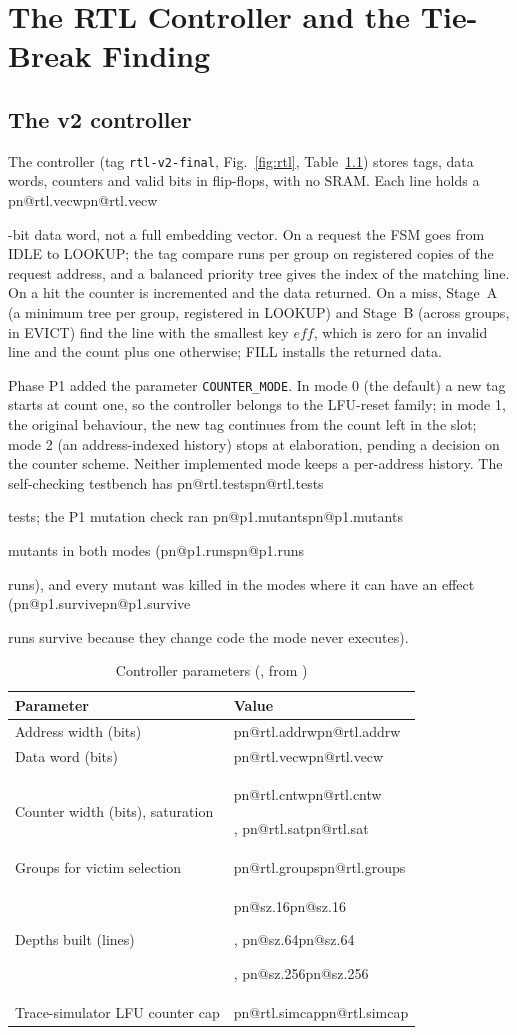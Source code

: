 \documentclass[11pt,a4paper]{report}
\makeatletter
\DeclareRobustCommand{\R}[1]{\ifcsname pn@#1\endcsname\csname pn@#1\endcsname\else
  \PackageError{report}{number key '#1' is not defined in macros.tex}{Run tools/make_paper_macros.py --target report}\fi}
\makeatother
\begin{document}
\chapter{The RTL Controller and the Tie-Break Finding}\label{ch:rtl}
\section{The v2 controller}
The controller (tag \texttt{rtl-v2-final}, Fig.~\ref{fig:rtl}, Table~\ref{tab:rtlparams}) stores tags, data words,
counters and valid bits in flip-flops, with no SRAM. Each line holds a \R{rtl.vecw}-bit data word, not a full
embedding vector. On a request the FSM goes from IDLE to LOOKUP; the tag compare runs per group on registered copies
of the request address, and a balanced priority tree gives the index of the matching line. On a hit the counter is
incremented and the data returned. On a miss, Stage~A (a minimum tree per group, registered in LOOKUP) and Stage~B
(across groups, in EVICT) find the line with the smallest key $\mathit{eff}$, which is zero for an invalid line and
the count plus one otherwise; FILL installs the returned data.

Phase P1 added the parameter \texttt{COUNTER\_MODE}. In mode 0 (the default) a new tag starts at count one, so the
controller belongs to the LFU-reset family; in mode 1, the original behaviour, the new tag continues from the count
left in the slot; mode 2 (an address-indexed history) stops at elaboration, pending a decision on the counter
scheme. Neither implemented mode keeps a per-address history. The self-checking testbench has \R{rtl.tests} tests;
the P1 mutation check ran \R{p1.mutants} mutants in both modes (\R{p1.runs} runs), and every mutant was killed in the
modes where it can have an effect (\R{p1.survive} runs survive because they change code the mode never executes).

\begin{table}[ht]
\centering
\caption{Controller parameters (\protect{}, from \protect{})}
\label{tab:rtlparams}
\begin{tabular}{@{}ll@{}}
\toprule
Parameter & Value \\
\midrule
Address width (bits) & \R{rtl.addrw} \\
Data word (bits) & \R{rtl.vecw} \\
Counter width (bits), saturation & \R{rtl.cntw}, \R{rtl.sat} \\
Groups for victim selection & \R{rtl.groups} \\
Depths built (lines) & \R{sz.16}, \R{sz.64}, \R{sz.256} \\
Trace-simulator LFU counter cap & \R{rtl.simcap} \\
\bottomrule
\end{tabular}
\end{table}
\end{document}
